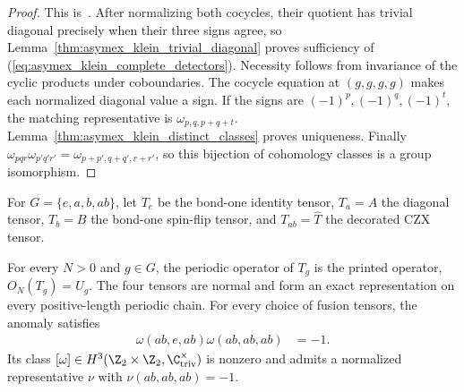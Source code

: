 \begin{proof}
    \leanok
    This is~\cite[``Complete classification of Klein
        three-cocycles'']{QICLean2026Blueprint}.
    After normalizing both cocycles, their quotient has trivial diagonal
    precisely when their three signs agree, so
    Lemma~\ref{thm:asymex_klein_trivial_diagonal} proves sufficiency of
    (\ref{eq:asymex_klein_complete_detectors}). Necessity follows from
    invariance of the cyclic products under coboundaries.
    The cocycle equation at $(g,g,g,g)$ makes each normalized diagonal
    value a sign. If the signs are $(-1)^p,(-1)^q,(-1)^t$, the matching
    representative is $\omega_{p,q,p+q+t}$.
    Lemma~\ref{thm:asymex_klein_distinct_classes} proves uniqueness.
    Finally $\omega_{pqr}\omega_{p'q'r'}=\omega_{p+p',q+q',r+r'}$, so
    this bijection of cohomology classes is a group isomorphism.
\end{proof}

\begin{definition}
    \label{def:asymex_klein_printed_family}
    \leanok
    For $G=\{e,a,b,ab\}$, let $T_e$ be the bond-one identity tensor,
    $T_a=A$ the diagonal tensor, $T_b=B$ the bond-one spin-flip tensor,
    and $T_{ab}=\widehat T$ the decorated CZX tensor.
\end{definition}

\begin{lemma}
    \label{thm:asymex_klein_printed_anomaly}
    \leanok
    For every $N>0$ and $g\in G$, the periodic operator of $T_g$ is the
    printed operator, $O_N(T_g)=U_g$. The four tensors are normal and form
    an exact representation on every positive-length periodic chain.
    For every choice of fusion tensors,
    the anomaly satisfies
    \begin{align}
        \label{eq:asymex_klein_printed_anomaly}
        \omega(ab,e,ab)\omega(ab,ab,ab) & =-1.
    \end{align}
    Its class $[\omega]\in H^3(\Z_2\times\Z_2,\C^\times_{\mathrm{triv}})$
    is nonzero and admits a normalized representative $\nu$
    with $\nu(ab,ab,ab)=-1$.
\end{lemma}


